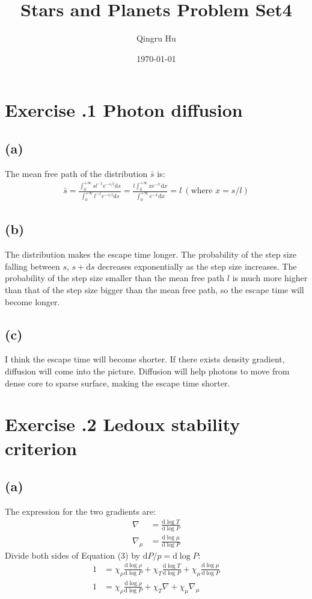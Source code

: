 \documentclass[a4paper,12pt]{article}
\title{\textbf{Stars and Planets Problem Set4}}
\author{Qingru Hu}
\date{\today}
\renewcommand{\d}{\mathrm{d}}
\begin{document}
\maketitle
\section*{\textbf{Exercise \uppercase\expandafter{}.1 Photon diffusion}}
\subsection*{(a)}
The mean free path of the distribution $\bar{s}$ is:
\begin{align*}
    \bar{s} = \frac{\int_{0}^{+\infty} s l^{-1} e^{-s/l} \d s}{\int_{0}^{+\infty} l^{-1} e^{-s/l} \d s} = 
    \frac{l \int_{0}^{+\infty} x e^{-x} \d x}{\int_{0}^{+\infty} e^{-x} \d x}
    = l \ (\text{where } x = s/l)
\end{align*}


\subsection*{(b)}
The distribution makes the escape time longer. The probability of the step size falling between $s$, $s+\d s$ 
decreases exponentially as the step size increases. The probability of the step size smaller than the mean free path $l$
is much more higher than that of the step size bigger than the mean free path, so the escape time will become longer.

\subsection*{(c)}
I think the escape time will become shorter. If there exists density gradient, diffusion will come into the picture.
Diffusion will help photons to move from dense core to sparse surface, making the escape time shorter.



\section*{\textbf{Exercise \uppercase\expandafter{}.2 Ledoux stability criterion}}
\subsection*{(a)}
The expression for the two gradients are:
\begin{align*}
    \nabla &= \frac{\d \log T}{\d \log P} \\
    \nabla_\mu &= \frac{\d \log \mu }{\d \log P}
\end{align*}
Divide both sides of Equation (3) by $\d P/ p = \d \log P$:
\begin{align*}
    1 &= \chi_\rho \frac{\d \log \rho}{\d \log P} + \chi_T \frac{\d \log T}{\d \log P} + \chi_\mu \frac{\d \log \mu}{\d \log P} \\
    1 &= \chi_\rho \frac{\d \log \rho}{\d \log P} + \chi_T \nabla + \chi_\mu \nabla_\mu
\end{align*}
\end{document}
